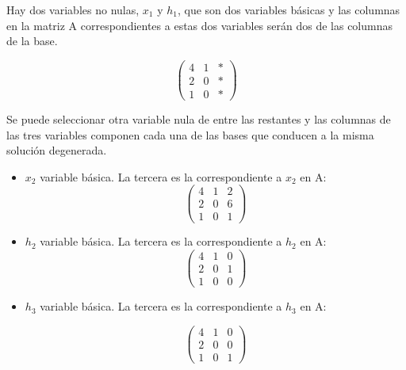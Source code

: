 \begin{enumerate}
    Hay dos variables no nulas, $x_1$ y $h_1$, que son dos variables básicas y las columnas en la matriz A correspondientes a estas dos variables serán dos de las columnas de la base.

    \[
            \begin{pmatrix}
               4 & 1 &  * \\
               2 & 0 &  *\\
               1 & 0 &  * 
            \end{pmatrix} 
            \]
    
    Se puede seleccionar otra variable nula de entre las restantes y las columnas de las tres variables componen cada una de las bases que conducen a la misma solución degenerada.
    
    \begin{itemize}
        \item $x_2$ variable básica. La tercera es la correspondiente a $x_2$ en A:
            \[
            \begin{pmatrix}
               4 &  1 &  2\\
               2 &  0 &  6 \\
               1 &  0 &  1 
            \end{pmatrix} 
            \]
        \item $h_2$ variable básica. La tercera es la correspondiente a $h_2$ en A:
        \[
            \begin{pmatrix}
               4 &  1 &  0\\
               2 &  0 &  1\\
               1 &  0 &  0
            \end{pmatrix} 
            \]
        
        \item $h_3$ variable básica. La tercera es la correspondiente a $h_3$ en A:

        \[
            \begin{pmatrix}
               4 &  1 &  0\\
               2 &  0 &  0\\
               1 &  0 &  1
            \end{pmatrix} 
            \]
    \end{itemize}
    
\end{enumerate}